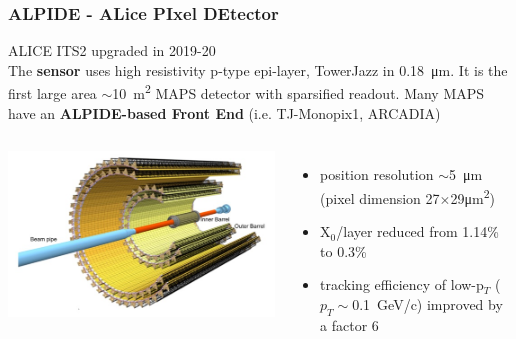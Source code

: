     \begin{frame}[noframenumbering]
        \frametitle{ALPIDE - ALice PIxel DEtector}
        ALICE ITS2 upgraded in 2019-20\\
        \smallskip
        The \textbf{sensor} uses high resistivity p-type epi-layer, TowerJazz in \SI{0.18}{\um}. It is the first large area $\sim$\SI{10}{m\squared} MAPS detector with sparsified readout.
        Many MAPS have an \textbf{ALPIDE-based Front End} (i.e. TJ-Monopix1, ARCADIA)
        \begin{columns}
                \includegraphics[width=1.3\linewidth]{figures/pixel_detectors_usage/alice.png}
            \begin{itemize}
                \item position resolution $\sim$\SI{5}{\um} (pixel dimension 27$\times$29\si{\um\squared})
                \item X$_0$/layer reduced from 1.14\% to 0.3\%
                \item tracking efficiency of low-p$_T$ ($p_T \sim$\SI{0.1}{GeV/c}) improved by a factor 6
            \end{itemize}
        \end{columns}
    \end{frame} 

